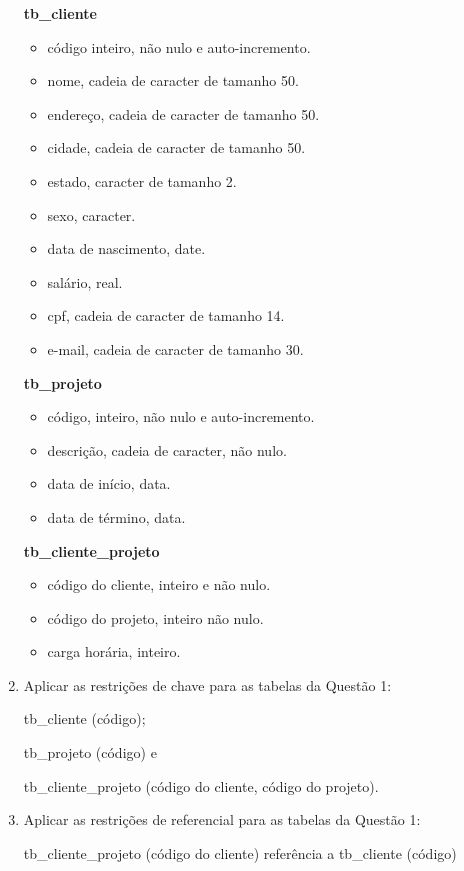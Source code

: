 \documentclass[11pt]{article}
\begin{document}
\begin{enumerate}
		\textbf{tb\_cliente}
		\begin{itemize}
			\item código inteiro, não nulo e auto-incremento.
			\item nome, cadeia de caracter de tamanho 50.
			\item endereço, cadeia de caracter de tamanho 50.
			\item cidade, cadeia de caracter de tamanho 50.
			\item estado, caracter de tamanho 2.
			\item sexo, caracter.
			\item data de nascimento, date.
			\item salário, real.
			\item cpf, cadeia de caracter de tamanho 14.
			\item e-mail, cadeia de caracter de tamanho 30.
		\end{itemize}
		
		\textbf{tb\_projeto}
		\begin{itemize}
			\item código, inteiro, não nulo e auto-incremento.
			\item descrição, cadeia de caracter, não nulo.
			\item data de início, data.
			\item data de término, data.
		\end{itemize}
		
		\textbf{tb\_cliente\_projeto}
		\begin{itemize}
			\item código do cliente, inteiro e não nulo.
			\item código do projeto, inteiro não nulo.
			\item carga horária, inteiro.
		\end{itemize}
		
		\item Aplicar as restrições de chave para as tabelas da Questão 1:
		
		tb\_cliente (código);
		
		tb\_projeto (código) e
		
		tb\_cliente\_projeto (código do cliente, código do projeto).
		
		\item Aplicar as restrições de referencial para as tabelas da Questão 1:
		
		tb\_cliente\_projeto (código do cliente) referência a tb\_cliente (código)
		

\end{enumerate}
\end{document}
